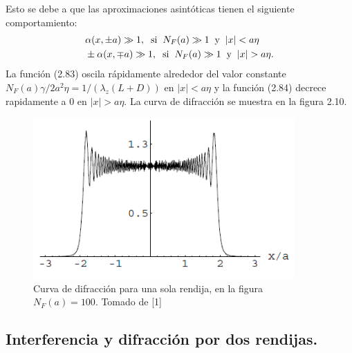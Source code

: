 Esto se debe a que las aproximaciones asintóticas tienen el siguiente comportamiento:
\begin{eqnarray}
&\alpha(x,\pm a)\gg 1,\hspace{0.2cm} \text{si}\hspace{0.2cm} N_F(a)\gg 1 \hspace{0.2cm} \text{y}\hspace{0.2cm} |x|<a\eta\\
&\pm\alpha(x,\mp a)\gg 1,\hspace{0.2cm} \text{si}\hspace{0.2cm} N_F(a)\gg 1 \hspace{0.2cm} \text{y}\hspace{0.2cm} |x|>a\eta .
\end{eqnarray}
La función (2.83) oscila rápidamente alrededor del valor constante $N_F(a)\gamma/2a^2\eta=1/(\lambda_z(L+D))$ en $|x|<a\eta$ y la función (2.84) decrece rapidamente a 0 en $|x|>a\eta$. La curva de difracción se muestra en la figura 2.10.
\begin{figure}[h!]
\centering
\includegraphics[width=10cm]{Imagenes/Fig10}
\caption[Patrón de interferencia, 1 rendija, regimen de Fresnel]{Curva de difracción para una sola rendija, en la figura  $N_F(a)=100$. Tomado de [1]}
\end{figure}



\subsection{Interferencia y difracción por dos rendijas.}

